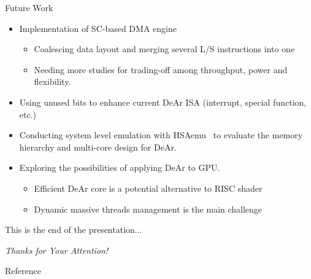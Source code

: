 \documentclass[handout]{beamer}
\begin{document}
\begin{CJK}{UTF8}{bkai}
            \begin{frame}{Future Work}
                \begin{itemize}
                    \item <2->{Implementation of SC-based DMA engine
                            \begin{itemize}
                                \item Coalescing data layout and merging several L/S instructions into one
                                \item Needing more studies for trading-off among throughput, power and flexibility. 
                            \end{itemize}
                        }
                    \item <3->{Using unused bits to enhance current DeAr ISA (interrupt, special function, etc.)}
                    \item <4->{Conducting system level emulation with HSAemu~ to evaluate the memory hierarchy and multi-core design for DeAr.}
                    \item <5->{Exploring the possibilities of applying DeAr to GPU.
                            \begin{itemize}
                                \item Efficient DeAr core is a potential alternative to RISC shader
                                \item Dynamic massive threads management is the main challenge
                            \end{itemize}
                        }
                \end{itemize}

            \end{frame}

            \begin{frame}[plain,c]
                \huge{This is the end of the presentation...}
                \begin{center}
                    \Huge{\textit{Thanks for Your Attention!}}
                \end{center}
            \end{frame}

            \begin{frame}[allowframebreaks]{Reference}
                \printbibliography
            \end{frame}


        \end{CJK}
        
\end{document}
